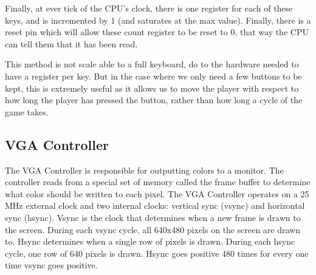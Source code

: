 \documentclass[onecolumn]{IEEEtran}
\begin{document}
Finally, at ever tick of the CPU's clock, there is one register for each of these keys, and is incremented by 1 (and saturates at the max value).  Finally, there is a reset pin which will allow these count register to be reset to 0, that way the CPU can tell them that it has been read.

This method is not scale able to a full keyboard, do to the hardware needed to have a register per key.  But in the case where we only need a few buttons to be kept, this is extremely useful as it allows us to move the player with respect to how long the player has pressed the button, rather than how long a cycle of the game takes.

\subsection{VGA Controller}
The VGA Controller is responsible for outputting colors to a monitor.  The controller reads from a special set of memory called the frame buffer to determine what color should be written to each pixel.  The VGA Controller operates on a 25 MHz external clock and two internal clocks: vertical sync (vsync) and horizontal sync (hsync).  Vsync is the clock that determines when a new frame is drawn to the screen.  During each vsync cycle, all 640x480 pixels on the screen are drawn to.  Hsync determines when a single row of pixels is drawn.  During each hsync cycle, one row of 640 pixels is drawn.  Hsync goes positive 480 times for every one time vsync goes positive.
\end{document}

